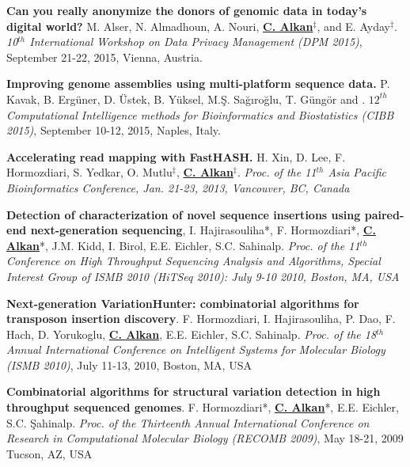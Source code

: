 \vspace{-.2cm}
{\bf Can you really anonymize the donors of genomic data in today's digital world?}
M. Alser, N. Almadhoun, A. Nouri, {\bf {\underline{C. Alkan}}}$^\ddag$, and E. Ayday$^\ddag$. 
{\em 10$^{th}$ International Workshop on Data Privacy Management (DPM 2015)}, 
 September 21-22, 2015, Vienna, Austria.


\vspace{-.2cm}

{\bf Improving genome assemblies using multi-platform sequence data.}
P. Kavak, B. Ergüner, D. Üstek, B. Yüksel, M.Ş. Sağıroğlu, T. Güngör and \calkan{}.
{\em $12^{th}$ Computational Intelligence methods for Bioinformatics and Biostatistics (CIBB 2015)}, 
 September 10-12, 2015, Naples, Italy.


\vspace{-.2cm}
{\bf Accelerating read mapping with FastHASH.}
H. Xin, D. Lee, F. Hormozdiari, S. Yedkar, O. Mutlu$^\ddag$, {\bf {\underline {C. Alkan}}}$^\ddag$.
{\em  Proc. of the 11$^{th}$  Asia Pacific Bioinformatics Conference,
Jan. 21-23, 2013, Vancouver, BC, Canada}

\vspace{-.2cm}
{\bf Detection of characterization of novel sequence insertions using paired-end next-generation sequencing},
 I. Hajirasouliha*, F. Hormozdiari*, {\bf {\underline{C. Alkan}}}*, J.M. Kidd, I. Birol, E.E. Eichler,
 S.C. Sahinalp.
{\em  Proc. of the 11$^{th}$  Conference on High Throughput Sequencing Analysis and Algorithms, Special Interest
Group of ISMB 2010 (HiTSeq 2010): July 9-10 2010, Boston, MA, USA}

\vspace{-.2cm}
{\bf Next-generation VariationHunter: combinatorial algorithms for transposon insertion discovery}.
F. Hormozdiari, I. Hajirasouliha, P. Dao, F. Hach, D. Yorukoglu, {\bf {\underline{C. Alkan}}},
 E.E. Eichler, S.C. Sahinalp.
{\em Proc. of the 18$^{th}$ Annual International Conference on Intelligent Systems
for Molecular Biology (ISMB 2010)}, July 11-13, 2010, Boston, MA, USA



\vspace{-.2cm}
{\bf  Combinatorial algorithms for structural variation detection in high throughput sequenced genomes}.
F. Hormozdiari*, {\bf {\underline{C. Alkan}}}*, E.E. Eichler, S.C. \c{S}ahinalp.
{\em Proc. of the
 Thirteenth Annual International Conference on Research in Computational Molecular 
Biology (RECOMB 2009)}, May 18-21, 2009 Tucson, AZ, USA

